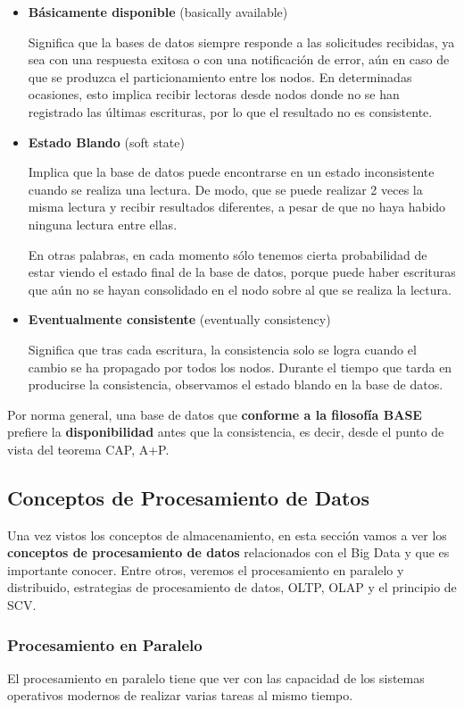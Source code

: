\begin{itemize}
	\item \textbf{Básicamente disponible} (basically available)
	
	Significa que la bases de datos siempre responde a las solicitudes recibidas, ya sea con una respuesta exitosa o con una notificación de error, aún en caso de que se produzca el particionamiento entre los nodos. En determinadas ocasiones, esto implica recibir lectoras desde nodos donde no se han registrado las últimas escrituras, por lo que el resultado no es consistente.
	
	\item \textbf{Estado Blando} (soft state)
	
	Implica que la base de datos puede encontrarse en un estado inconsistente cuando se realiza una lectura. De modo, que se puede realizar 2 veces la misma lectura y recibir resultados diferentes, a pesar de que no haya habido ninguna lectura entre ellas.
	
	En otras palabras, en cada momento sólo tenemos cierta probabilidad de estar viendo el estado final de la base de datos, porque puede haber escrituras que aún no se hayan consolidado en el nodo sobre al que se realiza la lectura.
	
	\item \textbf{Eventualmente consistente} (eventually consistency)
	
	Significa que tras cada escritura, la consistencia solo se logra cuando el cambio se ha propagado por todos los nodos. Durante el tiempo que tarda en producirse la consistencia, observamos el estado blando en la base de datos.
\end{itemize}

Por norma general, una base de datos que \textbf{conforme a la filosofía BASE} prefiere la \textbf{disponibilidad} antes que la consistencia, es decir, desde el punto de vista del teorema CAP, A+P.

\subsection{Conceptos de Procesamiento de Datos}
Una vez vistos los conceptos de almacenamiento, en esta sección vamos a ver los \textbf{conceptos de procesamiento de datos} relacionados con el Big Data y que es importante conocer. Entre otros, veremos el procesamiento en paralelo y distribuido, estrategias de procesamiento de datos, OLTP, OLAP y el principio de SCV.

\subsubsection{Procesamiento en Paralelo}
El procesamiento en paralelo tiene que ver con las capacidad de los sistemas operativos modernos de realizar varias tareas al mismo tiempo. 


